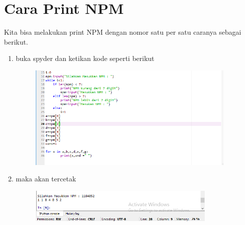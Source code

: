 \chapter*{Cara Print NPM }

\par
Kita bisa melakukan print NPM dengan nomor satu per satu caranya sebagai berikut.


\begin{enumerate}
   

\item buka spyder dan ketikan kode seperti berikut
	\begin{figure} [h]
	\includegraphics[width=10cm]{npm/npm3.png}
	\centering
	\end{figure}
	
	
	
 \item maka akan tercetak 
 \begin{figure} [h]
	\includegraphics[width=9cm]{npm/npm4.png}
	\centering
	\end{figure}
 
	
	\end{enumerate}

